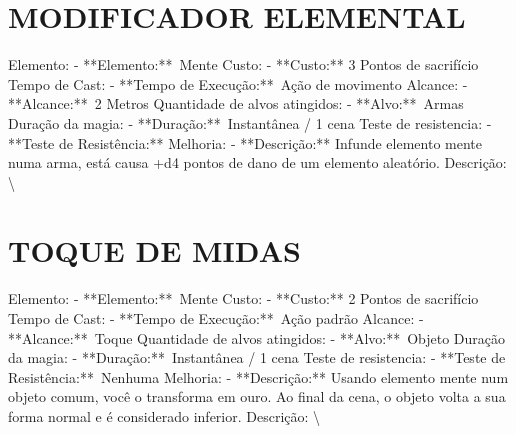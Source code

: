 \documentclass{article}%
\begin{document}
%
\section{MODIFICADOR ELEMENTAL}%
\label{sec:MODIFICADORELEMENTAL}%
Elemento: {-} **Elemento:**~Mente\newline%
Custo: {-} **Custo:** 3 Pontos de sacrifício\newline%
Tempo de Cast: {-} **Tempo de Execução:**~Ação de movimento\newline%
Alcance: {-} **Alcance:**~2 Metros\newline%
Quantidade de alvos atingidos: {-} **Alvo:**~Armas\newline%
Duração da magia: {-} **Duração:**~Instantânea / 1 cena\newline%
Teste de resistencia: {-} **Teste de Resistência:**\newline%
Melhoria: {-} **Descrição:** Infunde elemento mente numa arma, está causa +d4 pontos de dano de um elemento aleatório.\newline%
Descrição: \textbackslash{}

%
\section{TOQUE DE MIDAS}%
\label{sec:TOQUEDEMIDAS}%
Elemento: {-} **Elemento:**~Mente\newline%
Custo: {-} **Custo:** 2 Pontos de sacrifício\newline%
Tempo de Cast: {-} **Tempo de Execução:**~Ação padrão\newline%
Alcance: {-} **Alcance:**~Toque\newline%
Quantidade de alvos atingidos: {-} **Alvo:**~Objeto\newline%
Duração da magia: {-} **Duração:**~Instantânea / 1 cena\newline%
Teste de resistencia: {-} **Teste de Resistência:**~Nenhuma\newline%
Melhoria: {-} **Descrição:** Usando elemento mente num objeto comum, você o transforma em ouro. Ao final da cena, o objeto volta a sua forma normal e é considerado inferior.\newline%
Descrição: \textbackslash{}

%
\end{document}
